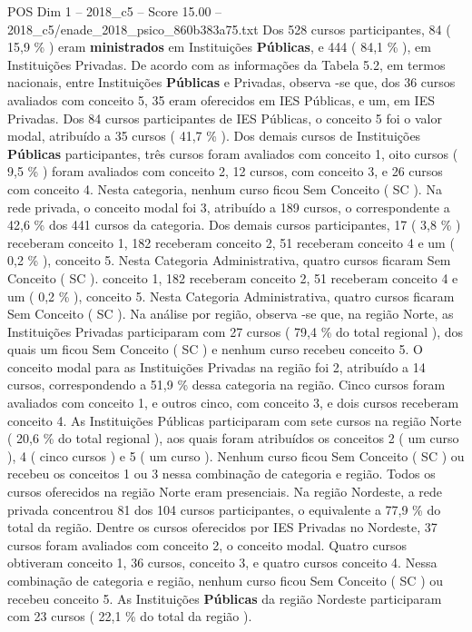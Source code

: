 \begin{textsample}{POS Dim 1 – 2018\_c5 – Score 15.00 – 2018\_c5/enade\_2018\_psico\_860b383a75.txt}
Dos 528 cursos participantes, 84 ( 15,9 \% ) eram \textbf{ministrados} em Instituições \textbf{Públicas}, e 444 ( 84,1 \% ), em Instituições Privadas.
De acordo com as informações da Tabela 5.2, em termos nacionais, entre Instituições \textbf{Públicas} e Privadas, observa -se que, dos 36 cursos avaliados com conceito 5, 35 eram oferecidos em IES Públicas, e um, em IES Privadas.
Dos 84 cursos participantes de IES Públicas, o conceito 5 foi o valor modal, atribuído a 35 cursos ( 41,7 \% ).
Dos demais cursos de Instituições \textbf{Públicas} participantes, três cursos foram avaliados com conceito 1, oito cursos ( 9,5 \% ) foram avaliados com conceito 2, 12 cursos, com conceito 3, e 26 cursos com conceito 4.
Nesta categoria, nenhum curso ficou Sem Conceito ( SC ).
Na rede privada, o conceito modal foi 3, atribuído a 189 cursos, o correspondente a 42,6 \% dos 441 cursos da categoria.
Dos demais cursos participantes, 17 ( 3,8 \% ) receberam conceito 1, 182 receberam conceito 2, 51 receberam conceito 4 e um ( 0,2 \% ), conceito 5.
Nesta Categoria Administrativa, quatro cursos ficaram Sem Conceito ( SC ). conceito 1, 182 receberam conceito 2, 51 receberam conceito 4 e um ( 0,2 \% ), conceito 5.
Nesta Categoria Administrativa, quatro cursos ficaram Sem Conceito ( SC ).
Na análise por região, observa -se que, na região Norte, as Instituições Privadas participaram com 27 cursos ( 79,4 \% do total regional ), dos quais um ficou Sem Conceito ( SC ) e nenhum curso recebeu conceito 5.
O conceito modal para as Instituições Privadas na região foi 2, atribuído a 14 cursos, correspondendo a 51,9 \% dessa categoria na região.
Cinco cursos foram avaliados com conceito 1, e outros cinco, com conceito 3, e dois cursos receberam conceito 4.
As Instituições Públicas participaram com sete cursos na região Norte ( 20,6 \% do total regional ), aos quais foram atribuídos os conceitos 2 ( um curso ), 4 ( cinco cursos ) e 5 ( um curso ).
Nenhum curso ficou Sem Conceito ( SC ) ou recebeu os conceitos 1 ou 3 nessa combinação de categoria e região.
Todos os cursos oferecidos na região Norte eram presenciais.
Na região Nordeste, a rede privada concentrou 81 dos 104 cursos participantes, o equivalente a 77,9 \% do total da região.
Dentre os cursos oferecidos por IES Privadas no Nordeste, 37 cursos foram avaliados com conceito 2, o conceito modal.
Quatro cursos obtiveram conceito 1, 36 cursos, conceito 3, e quatro cursos conceito 4.
Nessa combinação de categoria e região, nenhum curso ficou Sem Conceito ( SC ) ou recebeu conceito 5.
As Instituições \textbf{Públicas} da região Nordeste participaram com 23 cursos ( 22,1 \% do total da região ).

\end{textsample}
